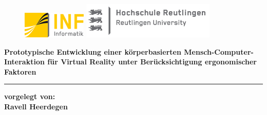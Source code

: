 \begin{titlepage}

\begin{center}

\begin{figure}
\begin{minipage}[H]{4cm}
\centering
\includegraphics[width=0.8\linewidth]{Bilder/Deckblatt/UniversityLogo}
\end{minipage}
\hfill
\begin{minipage}[H]{6cm}
\centering
\includegraphics[width=1\linewidth]{Bilder/Deckblatt/CompanyLogo}
\end{minipage}
\end{figure}



\vspace*{0.8cm}

\begin{doublespace}\textbf{{\large {\Large Prototypische Entwicklung einer körperbasierten Mensch-Computer-\break Interaktion für Virtual Reality unter Berücksichtigung ergonomischer Faktoren}}}\\
\end{doublespace}

\noindent\rule{\textwidth}{2pt}
\vspace*{0.6cm}

\textbf{vorgelegt von:\\}
{\large \textbf{Ravell Heerdegen\\}}


\end{center}
\end{titlepage}
